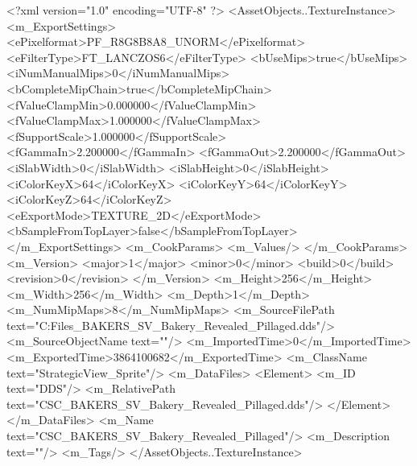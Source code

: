 <?xml version="1.0" encoding="UTF-8" ?>
<AssetObjects..TextureInstance>
	<m_ExportSettings>
		<ePixelformat>PF_R8G8B8A8_UNORM</ePixelformat>
		<eFilterType>FT_LANCZOS6</eFilterType>
		<bUseMips>true</bUseMips>
		<iNumManualMips>0</iNumManualMips>
		<bCompleteMipChain>true</bCompleteMipChain>
		<fValueClampMin>0.000000</fValueClampMin>
		<fValueClampMax>1.000000</fValueClampMax>
		<fSupportScale>1.000000</fSupportScale>
		<fGammaIn>2.200000</fGammaIn>
		<fGammaOut>2.200000</fGammaOut>
		<iSlabWidth>0</iSlabWidth>
		<iSlabHeight>0</iSlabHeight>
		<iColorKeyX>64</iColorKeyX>
		<iColorKeyY>64</iColorKeyY>
		<iColorKeyZ>64</iColorKeyZ>
		<eExportMode>TEXTURE_2D</eExportMode>
		<bSampleFromTopLayer>false</bSampleFromTopLayer>
	</m_ExportSettings>
	<m_CookParams>
		<m_Values/>
	</m_CookParams>
	<m_Version>
		<major>1</major>
		<minor>0</minor>
		<build>0</build>
		<revision>0</revision>
	</m_Version>
	<m_Height>256</m_Height>
	<m_Width>256</m_Width>
	<m_Depth>1</m_Depth>
	<m_NumMipMaps>8</m_NumMipMaps>
	<m_SourceFilePath text="C:\Users\Shadow\Desktop\Working Files\Icons\StrategicView\CSC_BAKERS_SV_Bakery_Revealed_Pillaged.dds"/>
	<m_SourceObjectName text=""/>
	<m_ImportedTime>0</m_ImportedTime>
	<m_ExportedTime>3864100682</m_ExportedTime>
	<m_ClassName text="StrategicView_Sprite"/>
	<m_DataFiles>
		<Element>
			<m_ID text="DDS"/>
			<m_RelativePath text="CSC_BAKERS_SV_Bakery_Revealed_Pillaged.dds"/>
		</Element>
	</m_DataFiles>
	<m_Name text="CSC_BAKERS_SV_Bakery_Revealed_Pillaged"/>
	<m_Description text=""/>
	<m_Tags/>
</AssetObjects..TextureInstance>

